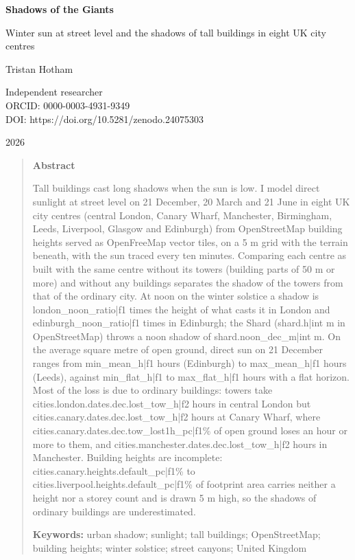 \documentclass[11pt,a4paper]{article}
\begin{document}
\begin{center}
{\Large\bfseries Shadows of the Giants\par}
\vspace{0.4em}
{\large Winter sun at street level and the shadows of tall buildings in eight UK city centres\par}
\vspace{1.2em}
{\large Tristan Hotham\par}
\vspace{0.3em}
{\small Independent researcher\\
ORCID: 0000-0003-4931-9349\\
DOI: https://doi.org/10.5281/zenodo.24075303\par}
\vspace{0.8em}
2026
\end{center}

\begin{quote}
\small
\begin{center}\textbf{Abstract}\end{center}
Tall buildings cast long shadows when the sun is low. I model direct sunlight at street level on 21 December, 20 March and 21 June in eight UK city centres (central London, Canary Wharf, Manchester, Birmingham, Leeds, Liverpool, Glasgow and Edinburgh) from OpenStreetMap building heights served as OpenFreeMap vector tiles, on a 5 m grid with the terrain beneath, with the sun traced every ten minutes. Comparing each centre as built with the same centre without its towers (building parts of 50 m or more) and without any buildings separates the shadow of the towers from that of the ordinary city. At noon on the winter solstice a shadow is {{london_noon_ratio|f1}} times the height of what casts it in London and {{edinburgh_noon_ratio|f1}} times in Edinburgh; the Shard ({{shard.h|int}} m in OpenStreetMap) throws a noon shadow of {{shard.noon_dec_m|int}} m. On the average square metre of open ground, direct sun on 21 December ranges from {{min_mean_h|f1}} hours (Edinburgh) to {{max_mean_h|f1}} hours (Leeds), against {{min_flat_h|f1}} to {{max_flat_h|f1}} hours with a flat horizon. Most of the loss is due to ordinary buildings: towers take {{cities.london.dates.dec.lost_tow_h|f2}} hours in central London but {{cities.canary.dates.dec.lost_tow_h|f2}} hours at Canary Wharf, where {{cities.canary.dates.dec.tow_lost1h_pc|f1}}\% of open ground loses an hour or more to them, and {{cities.manchester.dates.dec.lost_tow_h|f2}} hours in Manchester. Building heights are incomplete: {{cities.canary.heights.default_pc|f1}}\% to {{cities.liverpool.heights.default_pc|f1}}\% of footprint area carries neither a height nor a storey count and is drawn 5 m high, so the shadows of ordinary buildings are underestimated.

\textbf{Keywords:} urban shadow; sunlight; tall buildings; OpenStreetMap; building heights; winter solstice; street canyons; United Kingdom
\end{quote}
\end{document}
